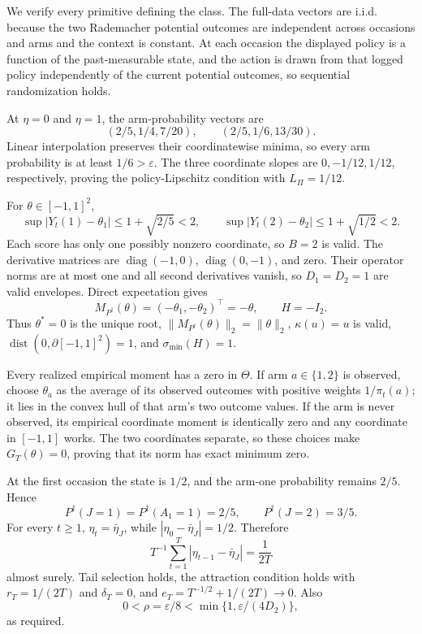 We verify every primitive defining the class. The full-data vectors are i.i.d. because the two Rademacher potential outcomes are independent across occasions and arms and the context is constant. At each occasion the displayed policy is a function of the past-measurable state, and the action is drawn from that logged policy independently of the current potential outcomes, so sequential randomization holds.

At \(\eta=0\) and \(\eta=1\), the arm-probability vectors are
\[
 (2/5,1/4,7/20),\qquad(2/5,1/6,13/30).
\]
Linear interpolation preserves their coordinatewise minima, so every arm probability is at least \(1/6>\varepsilon\). The three coordinate slopes are \(0,-1/12,1/12\), respectively, proving the policy-Lipschitz condition with \(L_\Pi=1/12\).

For \(\theta\in[-1,1]^2\),
\[
 \sup|Y_t(1)-\theta_1|\le1+\sqrt{2/5}<2,
 \qquad
 \sup|Y_t(2)-\theta_2|\le1+\sqrt{1/2}<2.
\]
Each score has only one possibly nonzero coordinate, so \(B=2\) is valid. The derivative matrices are \(\operatorname{diag}(-1,0)\), \(\operatorname{diag}(0,-1)\), and zero. Their operator norms are at most one and all second derivatives vanish, so \(D_1=D_2=1\) are valid envelopes. Direct expectation gives
\[
 M_{P^\dagger}(\theta)=(-\theta_1,-\theta_2)^\top=-\theta,
 \qquad H=-I_2.
\]
Thus \(\theta^*=0\) is the unique root, \(\|M_{P^\dagger}(\theta)\|_2=\|\theta\|_2\), \(\kappa(u)=u\) is valid, \(\operatorname{dist}(0,\partial[-1,1]^2)=1\), and \(\sigma_{\min}(H)=1\).

Every realized empirical moment has a zero in \(\Theta\). If arm \(a\in\{1,2\}\) is observed, choose \(\theta_a\) as the average of its observed outcomes with positive weights \(1/\pi_t(a)\); it lies in the convex hull of that arm's two outcome values. If the arm is never observed, its empirical coordinate moment is identically zero and any coordinate in \([-1,1]\) works. The two coordinates separate, so these choices make \(G_T(\theta)=0\), proving that its norm has exact minimum zero.

At the first occasion the state is \(1/2\), and the arm-one probability remains \(2/5\). Hence
\[
 P^\dagger(J=1)=P^\dagger(A_1=1)=2/5,
 \qquad P^\dagger(J=2)=3/5.
\]
For every \(t\ge1\), \(\eta_t=\bar\eta_J\), while \(|\eta_0-\bar\eta_J|=1/2\). Therefore
\[
 T^{-1}\sum_{t=1}^T|\eta_{t-1}-\bar\eta_J|=\frac1{2T}
\]
almost surely. Tail selection holds, the attraction condition holds with \(r_T=1/(2T)\) and \(\delta_T=0\), and \(e_T=T^{-1/2}+1/(2T)\to0\). Also
\[
 0<\rho=\varepsilon/8<\min\{1,\varepsilon/(4D_2)\},
\]
as required.


